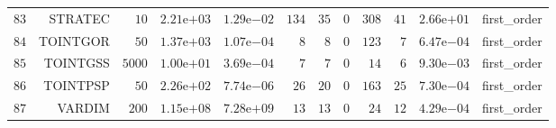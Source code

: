 \begin{longtable}{rrrrrrrrrrrr}
  \(    83\) & STRATEC & \(    10\) & \( 2.21\)e\(+03\) & \( 1.29\)e\(-02\) & \(   134\) & \(    35\) & \(     0\) & \(   308\) & \(    41\) & \( 2.66\)e\(+01\) & first\_order \\
  \(    84\) & TOINTGOR & \(    50\) & \( 1.37\)e\(+03\) & \( 1.07\)e\(-04\) & \(     8\) & \(     8\) & \(     0\) & \(   123\) & \(     7\) & \( 6.47\)e\(-04\) & first\_order \\
  \(    85\) & TOINTGSS & \(  5000\) & \( 1.00\)e\(+01\) & \( 3.69\)e\(-04\) & \(     7\) & \(     7\) & \(     0\) & \(    14\) & \(     6\) & \( 9.30\)e\(-03\) & first\_order \\
  \(    86\) & TOINTPSP & \(    50\) & \( 2.26\)e\(+02\) & \( 7.74\)e\(-06\) & \(    26\) & \(    20\) & \(     0\) & \(   163\) & \(    25\) & \( 7.30\)e\(-04\) & first\_order \\
  \(    87\) & VARDIM & \(   200\) & \( 1.15\)e\(+08\) & \( 7.28\)e\(+09\) & \(    13\) & \(    13\) & \(     0\) & \(    24\) & \(    12\) & \( 4.29\)e\(-04\) & first\_order \\\hline
\end{longtable}
